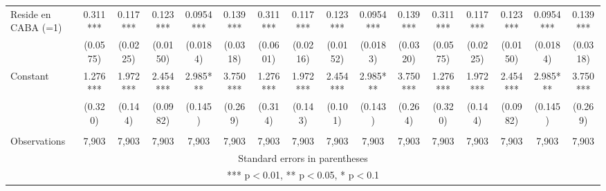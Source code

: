 \documentclass[]{article}
\begin{document}
\begin{tabular}{lccccccccccccccc}
Reside en CABA (=1) & 0.311*** & 0.117*** & 0.123*** & 0.0954*** & 0.139*** & 0.311*** & 0.117*** & 0.123*** & 0.0954*** & 0.139*** & 0.311*** & 0.117*** & 0.123*** & 0.0954*** & 0.139*** \\
 & (0.0575) & (0.0225) & (0.0150) & (0.0184) & (0.0318) & (0.0601) & (0.0216) & (0.0152) & (0.0183) & (0.0320) & (0.0575) & (0.0225) & (0.0150) & (0.0184) & (0.0318) \\
Constant & 1.276*** & 1.972*** & 2.454*** & 2.985*** & 3.750*** & 1.276*** & 1.972*** & 2.454*** & 2.985*** & 3.750*** & 1.276*** & 1.972*** & 2.454*** & 2.985*** & 3.750*** \\
 & (0.320) & (0.144) & (0.0982) & (0.145) & (0.269) & (0.314) & (0.143) & (0.101) & (0.143) & (0.264) & (0.320) & (0.144) & (0.0982) & (0.145) & (0.269) \\
 &  &  &  &  &  &  &  &  &  &  &  &  &  &  &  \\
 Observations & 7,903 & 7,903 & 7,903 & 7,903 & 7,903 & 7,903 & 7,903 & 7,903 & 7,903 & 7,903 & 7,903 & 7,903 & 7,903 & 7,903 & 7,903 \\ \hline
\multicolumn{16}{c}{ Standard errors in parentheses} \\
\multicolumn{16}{c}{ *** p$<$0.01, ** p$<$0.05, * p$<$0.1} \\
\end{tabular}
\end{document}
